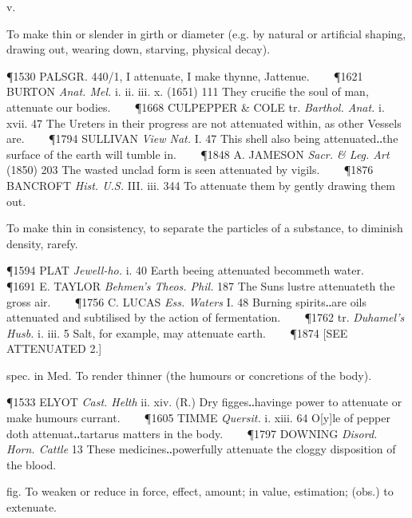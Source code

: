 \begin{description}[wide, labelwidth=!, labelindent=0pt]
 v.

\noindent {}

\noindent [f. L. attenuāt- ppl. stem of attenuāre, f. at- = ad- to + tenuāre to make thin, f. tenuis thin. Cf. F. atténuer, 12th c.]
\vspace{-0.3cm}

\begin{myenumerate}

 To make thin or slender in girth or diameter (e.g. by natural or artificial shaping, drawing out, wearing down, starving, physical decay).

\P 1530 PALSGR.  440/1, I attenuate, I make thynne, Jattenue.    
\P 1621 BURTON  \textit{Anat. Mel.} i. ii. iii. x. (1651) 111 They crucifie the soul of man, attenuate our bodies.    
\P 1668 CULPEPPER \& COLE tr. \textit{Barthol. Anat.} i. xvii. 47 The Ureters in their progress are not attenuated within, as other Vessels are.    
\P 1794 SULLIVAN  \textit{View Nat.} I. 47 This shell also being attenuated‥the surface of the earth will tumble in.    
\P 1848 A. JAMESON  \textit{Sacr. \& Leg. Art} (1850) 203 The wasted unclad form is seen attenuated by vigils.    
\P 1876 BANCROFT  \textit{Hist. U.S.} III. iii. 344 To attenuate them by gently drawing them out.

 To make thin in consistency, to separate the particles of a substance, to diminish density, rarefy.

\P 1594 PLAT  \textit{Jewell-ho.} i. 40 Earth beeing attenuated becommeth water.    
\P 1691 E. TAYLOR  \textit{Behmen's Theos. Phil.} 187 The Suns lustre attenuateth the gross air.    
\P 1756 C. LUCAS  \textit{Ess. Waters} I. 48 Burning spirits‥are oils attenuated and subtilised by the action of fermentation.    
\P 1762 tr. \textit{Duhamel's Husb.} i. iii. 5 Salt, for example, may attenuate earth.    
\P 1874 [SEE ATTENUATED 2.]

 spec. in Med. To render thinner (the humours or concretions of the body).

\P 1533 ELYOT  \textit{Cast. Helth} ii. xiv. (R.) Dry figges‥havinge power to attenuate or make humours currant.    
\P 1605 TIMME  \textit{Quersit.} i. xiii. 64 O[y]le of pepper doth attenuat‥tartarus matters in the body.    
\P 1797 DOWNING  \textit{Disord. Horn. Cattle} 13 These medicines‥powerfully attenuate the cloggy disposition of the blood.

 fig. To weaken or reduce in force, effect, amount; in value, estimation; (obs.) to extenuate.


\end{myenumerate}
\end{description}
